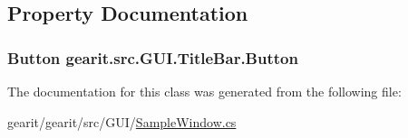 \subsection{Property Documentation}
\hypertarget{classgearit_1_1src_1_1_g_u_i_1_1_title_bar_a894f45d62b93a6ed2a5ef9655537ec39}{
\subsubsection[{Button}]{\setlength{\rightskip}{0pt plus 5cm}Button gearit.\+src.\+G\+U\+I.\+Title\+Bar.\+Button\hspace{0.3cm}{\ttfamily [get]}}}\label{classgearit_1_1src_1_1_g_u_i_1_1_title_bar_a894f45d62b93a6ed2a5ef9655537ec39}


The documentation for this class was generated from the following file\+:\begin{DoxyCompactItemize}
\item 
gearit/gearit/src/\+G\+U\+I/\hyperlink{_sample_window_8cs}{Sample\+Window.\+cs}\end{DoxyCompactItemize}
